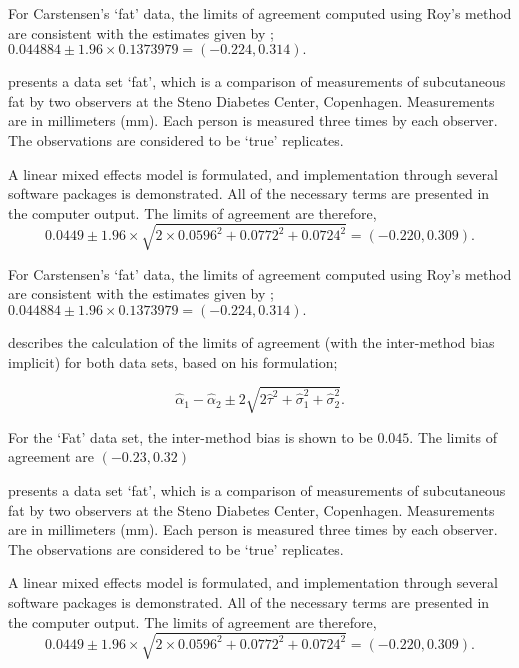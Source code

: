 \documentclass[12pt, a4paper]{report}
\theoremstyle{plain}
\theoremstyle{definition}
\theoremstyle{remark}
\begin{document}
For Carstensen's `fat' data, the limits of agreement computed using Roy's
method are consistent with the estimates given by \citet{BXC2008}; $0.044884  \pm 1.96 \times  0.1373979 = (-0.224,  0.314).$
		
		
	\citet{BXC2008} presents a data set `fat', which is a comparison of measurements of subcutaneous fat
	by two observers at the Steno Diabetes Center, Copenhagen. Measurements are in millimeters
	(mm). Each person is measured three times by each observer. The observations are considered to be `true' replicates.
	
	A linear mixed effects model is formulated, and implementation through several software packages is demonstrated.
	All of the necessary terms are presented in the computer output. The limits of agreement are therefore,
	\begin{equation}
	0.0449  \pm 1.96 \times  \sqrt{2 \times 0.0596^2 + 0.0772^2 + 0.0724^2} = (-0.220,  0.309).
	\end{equation}
	
	For Carstensen's `fat' data, the limits of agreement computed using Roy's
	method are consistent with the estimates given by \citet{BXC2008}; $0.044884  \pm 1.96 \times  0.1373979 = (-0.224,  0.314).$	
	
		
	\citet{BXC2008} describes the calculation of the limits of agreement (with the inter-method bias implicit) for both data sets, based on his formulation;
	
	\[\hat{\alpha}_1 - \hat{\alpha}_2 \pm 2\sqrt{2\hat{\tau}^2 +\hat{\sigma}_1^2 +\hat{\sigma}_2^2 }.\]
	
	For the `Fat' data set, the inter-method bias is shown to be $0.045$. The limits of agreement are $(-0.23 , 0.32)$
	
	
	\citet{BXC2008} presents a data set `fat', which is a comparison of measurements of subcutaneous fat
	by two observers at the Steno Diabetes Center, Copenhagen. Measurements are in millimeters
	(mm). Each person is measured three times by each observer. The observations are considered to be `true' replicates.
	
	A linear mixed effects model is formulated, and implementation through several software packages is demonstrated.
	All of the necessary terms are presented in the computer output. The limits of agreement are therefore,
	\begin{equation}
	0.0449  \pm 1.96 \times  \sqrt{2 \times 0.0596^2 + 0.0772^2 + 0.0724^2} = (-0.220,  0.309).
	\end{equation}
	
\end{document}
